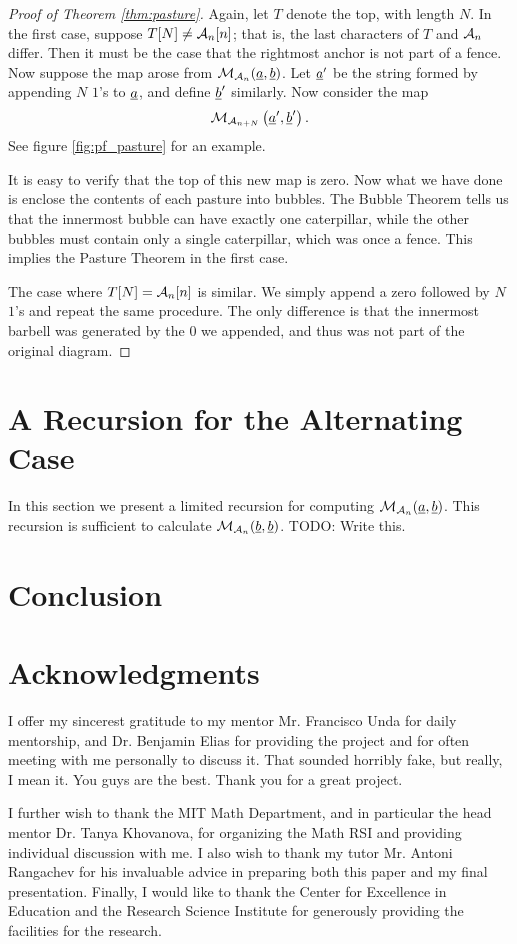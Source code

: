 \begin{proof}[Proof of Theorem \ref{thm:pasture}]
	Again, let $T$ denote the top, with length $N$.  In the first case, suppose $T[N] \neq \AA_n[n]$; that is, the last characters of $T$ and $\AA_n$ differ.  Then it must be the case that the rightmost anchor is not part of a fence.
	Now suppose the map arose from $\MM_{\AA_n}(\ul a, \ul b)$.  Let $\ul a'$ be the string formed by appending $N$ $1$'s to $\ul a$, and define $\ul b'$ similarly.  Now consider the map \[ \MM_{\AA_{n+N}} \left( \ul a', \ul b' \right). \]  See figure \ref{fig:pf_pasture} for an example.

	It is easy to verify that the top of this new map is zero.  Now what we have done is enclose the contents of each pasture into bubbles.  The Bubble Theorem tells us that the innermost bubble can have exactly one caterpillar, while the other bubbles must contain only a single caterpillar, which was once a fence.  This implies the Pasture Theorem in the first case.

	The case where $T[N] = \AA_n[n]$ is similar.  We simply append a zero followed by $N$ $1$'s and repeat the same procedure.  The only difference is that the innermost barbell was generated by the $0$ we appended, and thus was not part of the original diagram.
\end{proof}


\section{A Recursion for the Alternating Case}
In this section we present a limited recursion for computing $\MM_{\AA_n}(\ul a, \ul b)$.  This recursion is sufficient to calculate $\MM_{\AA_n}(\ul b, \ul b)$.
TODO: Write this.


\section{Conclusion}

\section{Acknowledgments} 
I offer my sincerest gratitude to my mentor Mr. Francisco Unda for daily mentorship, and Dr. Benjamin Elias for providing the project and for often meeting with me personally to discuss it.
That sounded horribly fake, but really, I mean it.  You guys are the best.  Thank you for a great project.

I further wish to thank the MIT Math Department, and in particular the head mentor Dr. Tanya Khovanova, for organizing the Math RSI and providing individual discussion with me.
I also wish to thank my tutor Mr. Antoni Rangachev for his invaluable advice in preparing both this paper and my final presentation.
Finally, I would like to thank the Center for Excellence in Education and the Research Science Institute for generously providing the facilities for the research.


